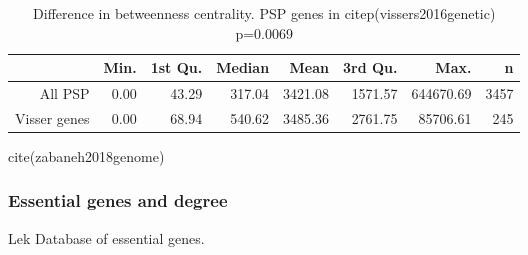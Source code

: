 \begin{table}[ht]
\centering
\begin{tabular}{rrrrrrrr}
  \hline
 & Min. & 1st Qu. & Median & Mean & 3rd Qu. & Max. & n\\ 
  \hline


All PSP & 0.00 & 43.29 & 317.04 & 3421.08 & 1571.57 & 644670.69 & 3457 \\ 
  Visser genes & 0.00 & 68.94 & 540.62 & 3485.36 & 2761.75 & 85706.61 & 245\\ 
   \hline
\end{tabular}
\caption{Difference in betweenness centrality. PSP genes in citep(vissers2016genetic) p=0.0069}
\label{table:visser_betweenness}
\end{table}
cite(zabaneh2018genome)
\subsubsection{Essential genes and degree}
Lek
Database of essential genes. 


